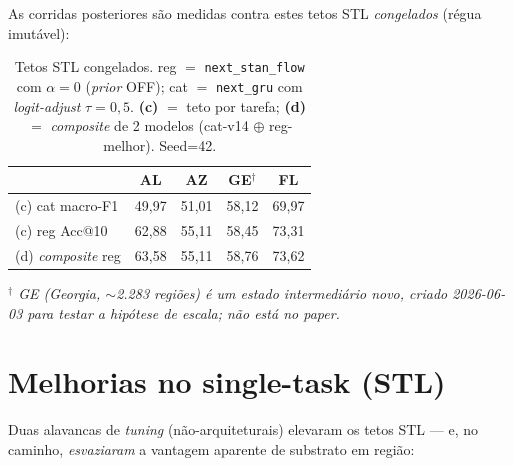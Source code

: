 \documentclass[11pt,a4paper]{article}
\newcommand{\note}[1]{\textcolor{black!55}{\textit{#1}}}
\begin{document}
As corridas posteriores são medidas contra estes tetos STL \emph{congelados} (régua imutável):

\begin{table}[H]
\centering
\footnotesize
\caption{Tetos STL congelados. reg $=$ \texttt{next\_stan\_flow} com $\alpha{=}0$ (\textit{prior} OFF);
cat $=$ \texttt{next\_gru} com \textit{logit-adjust} $\tau{=}0{,}5$. \textbf{(c)} $=$ teto por tarefa;
\textbf{(d)} $=$ \textit{composite} de 2 modelos (cat-v14 $\oplus$ reg-melhor). Seed=42.}
\begin{tabular}{lcccc}
\toprule
\textbf{} & \textbf{AL} & \textbf{AZ} & \textbf{GE}$^\dagger$ & \textbf{FL} \\
\midrule
(c) cat macro-F1 & 49,97 & 51,01 & 58,12 & 69,97 \\
(c) reg Acc@10   & 62,88 & 55,11 & 58,45 & 73,31 \\
(d) \textit{composite} reg & 63,58 & 55,11 & 58,76 & 73,62 \\
\bottomrule
\end{tabular}
\end{table}
\note{$^\dagger$ GE (Georgia, $\sim$2.283 regiões) é um estado \emph{intermediário novo}, criado
2026-06-03 para testar a hipótese de escala; não está no paper.}

\section{Melhorias no single-task (STL)}\label{sec:stl}

Duas alavancas de \textit{tuning} (não-arquiteturais) elevaram os tetos STL --- e, no caminho,
\emph{esvaziaram} a vantagem aparente de substrato em região:
\end{document}
